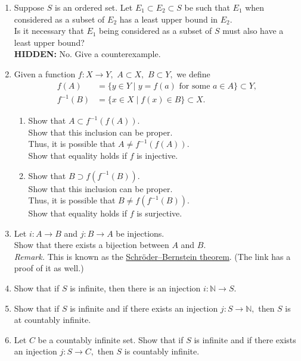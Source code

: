 \documentclass[12pt]{article}
\theoremstyle{definition}
\numberwithin{thm}{section}
\newcommand{\hint}[1]{\textbf{HIDDEN:} {\color[rgb]{0.95, 0.95, 0.95}#1}}
\begin{document}
\begin{enumerate}
	\item Suppose $S$ is an ordered set. Let $E_1 \subset E_2 \subset S$ be such that $E_1$ when considered as a subset of $E_2$ has a least upper bound in $E_2.$\\
	Is it necessary that $E_1$ being considered as a subset of $S$ must also have a least upper bound?\\
	\hint{No. Give a counterexample.}
	\item \label{q:funcinvproperties}%
	Given a function $f:X \to Y,$ $A \subset X,$ $B \subset Y,$ we define
	\begin{align*} 
		f(A) &= \{y \in Y \mid y = f(a) \text{ for some } a \in A\} \subset Y,\\
		f^{-1}(B) &= \{x \in X \mid f(x) \in B\} \subset X.
	\end{align*}
	\begin{enumerate}
		\item Show that $A \subset f^{-1}(f(A)).$ \\
		Show that this inclusion can be proper. \\
		Thus, it is possible that $A \neq f^{-1}(f(A)).$ \\
		Show that equality holds if $f$ is injective.
		\item Show that $B \supset f(f^{-1}(B)).$ \\
		Show that this inclusion can be proper. \\
		Thus, it is possible that $B \neq f(f^{-1}(B)).$ \\
		Show that equality holds if $f$ is surjective.
	\end{enumerate}
	\item Let $i:A \to B$ and $j:B\to A$ be injections.\\
	Show that there exists a bijection between $A$ and $B.$\\
	\emph{Remark.} This is known as the \href{https://en.wikipedia.org/wiki/Schr%C3%B6der%E2%80%93Bernstein_theorem}{Schröder–Bernstein theorem}. (The link has a proof of it as well.)
	\item Show that if $S$ is infinite, then there is an injection $i:\mathbb{N} \to S.$
	\item Show that if $S$ is infinite and if there exists an injection $j:S \to \mathbb{N},$ then $S$ is at countably infinite.
	\item Let $C$ be a countably infinite set. Show that if $S$ is infinite and if there exists an injection $j:S \to C,$ then $S$ is countably infinite.

\end{enumerate}
\end{document}
